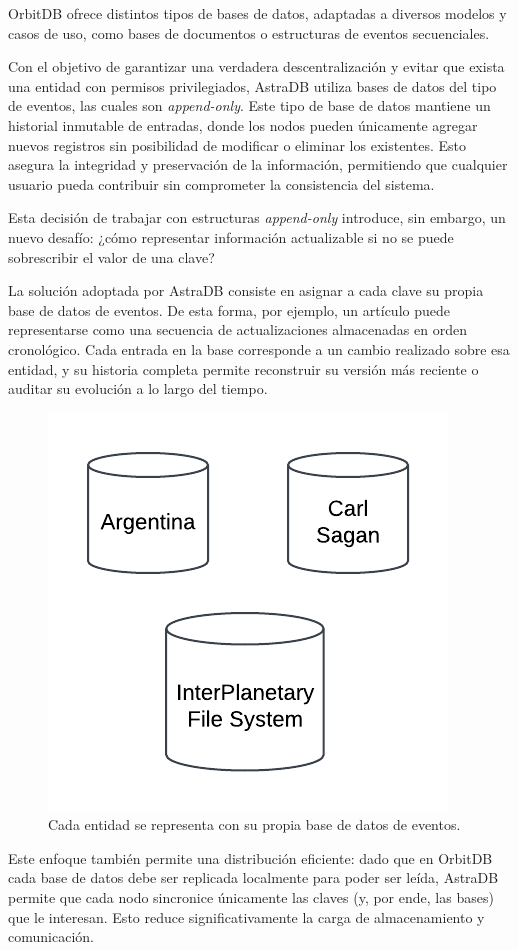 OrbitDB ofrece distintos tipos de bases de datos, adaptadas a diversos modelos y casos de uso, como bases de documentos o estructuras de eventos secuenciales.

Con el objetivo de garantizar una verdadera descentralización y evitar que exista una entidad con permisos privilegiados, AstraDB utiliza bases de datos del tipo de eventos, las cuales son \textit{append-only}. Este tipo de base de datos mantiene un historial inmutable de entradas, donde los nodos pueden únicamente agregar nuevos registros sin posibilidad de modificar o eliminar los existentes. Esto asegura la integridad y preservación de la información, permitiendo que cualquier usuario pueda contribuir sin comprometer la consistencia del sistema.

Esta decisión de trabajar con estructuras \textit{append-only} introduce, sin embargo, un nuevo desafío: ¿cómo representar información actualizable si no se puede sobrescribir el valor de una clave?

La solución adoptada por AstraDB consiste en asignar a cada clave su propia base de datos de eventos. De esta forma, por ejemplo, un artículo puede representarse como una secuencia de actualizaciones almacenadas en orden cronológico. Cada entrada en la base corresponde a un cambio realizado sobre esa entidad, y su historia completa permite reconstruir su versión más reciente o auditar su evolución a lo largo del tiempo.

\begin{figure}[H]
\centering
\includegraphics[width=0.4\linewidth]{img/solucion-ipfs/bdd-articulos.png}
\caption{Cada entidad se representa con su propia base de datos de eventos.}
\label{fig:bdd-articulos}
\end{figure}

Este enfoque también permite una distribución eficiente: dado que en OrbitDB cada base de datos debe ser replicada localmente para poder ser leída, AstraDB permite que cada nodo sincronice únicamente las claves (y, por ende, las bases) que le interesan. Esto reduce significativamente la carga de almacenamiento y comunicación.

